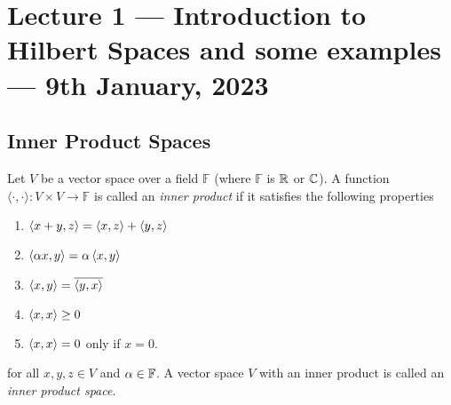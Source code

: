 \section{Lecture 1  --- Introduction to Hilbert Spaces and some examples --- 9th January, 2023}

\subsection{Inner Product Spaces}
\begin{definition}
    Let $V$ be a vector space over a field $\mathbb F$ (where $\mathbb F$ is $\mathbb R$ or $\mathbb C$). A function $\langle \cdot , \cdot \rangle : V \times V \to \mathbb F$ is called an \textit{inner product} if it satisfies the following properties
    \begin{enumerate}
	\item $\left\langle x+y, z \right\rangle = \left\langle x, z \right\rangle + \left\langle y, z \right\rangle$
	\item $\left\langle \alpha x, y \right\rangle = \alpha \left\langle x, y \right\rangle$
	\item $\left\langle x, y \right\rangle = \overline{\left\langle y, x \right\rangle}$
	\item $\left\langle x, x \right\rangle \ge 0$ 
	\item  $\left\langle x, x \right\rangle = 0$ only if $x=0.$
    \end{enumerate}
    for all $x,y,z \in V$ and $\alpha \in \mathbb F$. A vector space $V$ with an inner product is called an \textit{inner product space}.
    \label{def:inner-product}
\end{definition}

